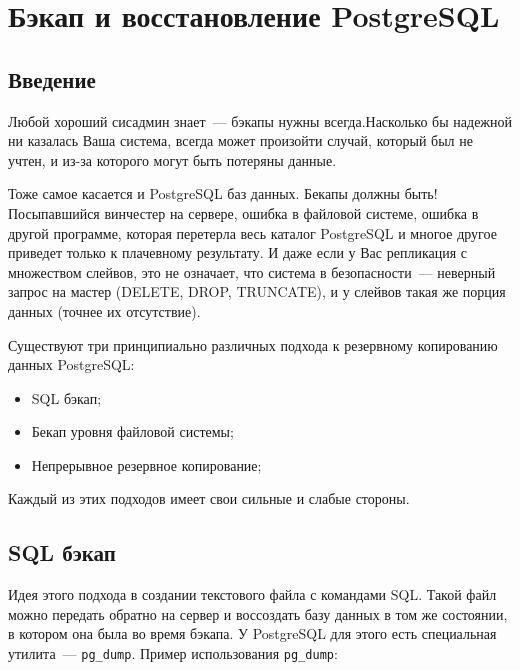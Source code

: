 \chapter{Бэкап и восстановление PostgreSQL}

\begin{epigraphs}
\end{epigraphs}

\section{Введение}

Любой хороший сисадмин знает~--- бэкапы нужны всегда.Насколько бы надежной ни казалась Ваша система, всегда может произойти случай, который был не учтен, и из-за которого могут быть потеряны данные.

Тоже самое касается и PostgreSQL баз данных. Бекапы должны быть! Посыпавшийся винчестер на сервере, ошибка в файловой системе, ошибка в другой программе, которая перетерла весь каталог PostgreSQL и многое другое приведет только к плачевному результату. И даже если у Вас репликация с множеством слейвов, это не означает, что система в безопасности~--- неверный запрос на мастер (DELETE, DROP, TRUNCATE), и у слейвов такая же порция данных (точнее их отсутствие).

Существуют три принципиально различных подхода к резервному копированию данных PostgreSQL:

\begin{itemize}
  \item SQL бэкап;
  \item Бекап уровня файловой системы;
  \item Непрерывное резервное копирование;
\end{itemize}

Каждый из этих подходов имеет свои сильные и слабые стороны.


\section{SQL бэкап}

Идея этого подхода в создании текстового файла с командами SQL. Такой файл можно передать обратно на сервер и воссоздать базу данных в том же состоянии, в котором она была во время бэкапа. У PostgreSQL для этого есть специальная утилита~--- \lstinline!pg_dump!. Пример использования \lstinline!pg_dump!:

